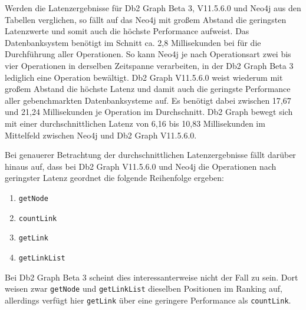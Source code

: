 \begin{table}[!ht]
\centering
{}
\caption{Latenz Linkbench-10M-Const Neo4j}
\label{tab:latenz_10m_const:neo4j}
\end{table}

Werden die Latenzergebnisse für Db2 Graph Beta 3, V11.5.6.0 und Neo4j aus den Tabellen verglichen, so fällt auf das Neo4j mit großem Abstand die geringsten Latenzwerte und somit auch die höchste Performance aufweist. Das Datenbanksystem benötigt im Schnitt ca. 2,8 Millisekunden bei für die Durchführung aller Operationen. So kann Neo4j je nach Operationsart zwei bis vier Operationen in derselben Zeitspanne verarbeiten, in der Db2 Graph Beta 3 lediglich eine Operation bewältigt. Db2 Graph V11.5.6.0 weist wiederum mit großem Abstand die höchste Latenz und damit auch die geringste Performance aller gebenchmarkten Datenbanksysteme auf. Es benötigt dabei zwischen 17,67 und 21,24 Millisekunden je Operation im Durchschnitt. Db2 Graph bewegt sich mit einer durchschnittlichen Latenz von 6,16 bis 10,83 Millisekunden im Mittelfeld zwischen Neo4j und Db2 Graph V11.5.6.0.

Bei genauerer Betrachtung der durchschnittlichen Latenzergebnisse fällt darüber hinaus auf, dass bei Db2 Graph V11.5.6.0 und Neo4j die Operationen nach geringster Latenz geordnet die folgende Reihenfolge ergeben:
\begin{enumerate}
    \item \texttt{getNode}
    \item \texttt{countLink}
    \item \texttt{getLink}
    \item \texttt{getLinkList}
\end{enumerate}
Bei Db2 Graph Beta 3 scheint dies interessanterweise nicht der Fall zu sein. Dort weisen zwar \texttt{getNode} und \texttt{getLinkList} dieselben Positionen im Ranking auf, allerdings verfügt hier \texttt{getLink} über eine geringere Performance als \texttt{countLink}.

